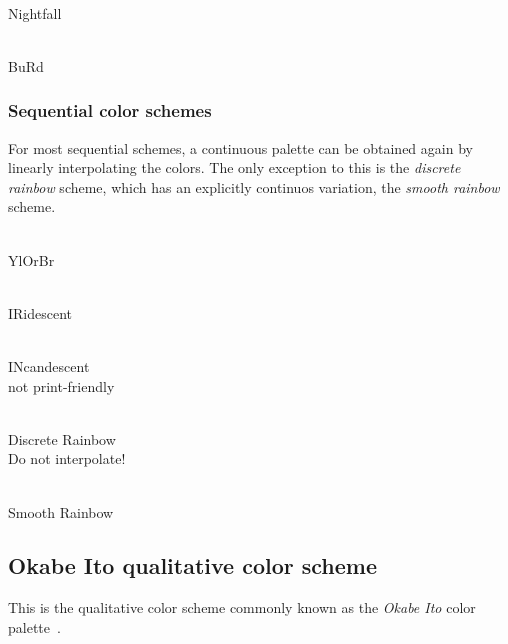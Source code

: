 \documentclass{scrartcl}
\begin{document}
\begin{center}
    \\
    Nightfall
\end{center}

\begin{center}
    \\
    BuRd
\end{center}

\subsubsection{Sequential color schemes}\label{sec:T-S}
For most sequential schemes, a continuous palette can be obtained again by linearly interpolating the colors.
The only exception to this is the \emph{discrete rainbow} scheme, which has an explicitly continuos variation, the \emph{smooth rainbow} scheme.%

\begin{center}
    \\
    YlOrBr
\end{center}

\begin{center}
    \\
    IRidescent
\end{center}

\begin{center}
    \\
    INcandescent\\
    not print-friendly
\end{center}

\begin{center}
    \\
    Discrete Rainbow\\
    Do not interpolate!
\end{center}

\begin{center}
    \\
    Smooth Rainbow\\
\end{center}

\subsection{Okabe Ito qualitative color scheme}\label{sec:OkabeIto}
This is the qualitative color scheme commonly known as the \emph{Okabe Ito} color palette~\cite{Ichihara_2008}.
\end{document}
